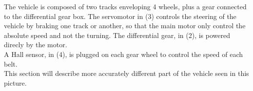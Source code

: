 The vehicle is composed of two tracks enveloping 4 wheels, plus a gear connected to the differential gear box. The servomotor in (3) controls the steering of the vehicle by braking one track or another, so that the main motor only control the absolute speed and not the turning. The differential gear, in (2), is powered direcly by the motor.\\
A Hall sensor, in (4), is plugged on each gear wheel to control the speed of each belt.\\
 This section will describe more accurately different part of the vehicle seen in this picture.\\